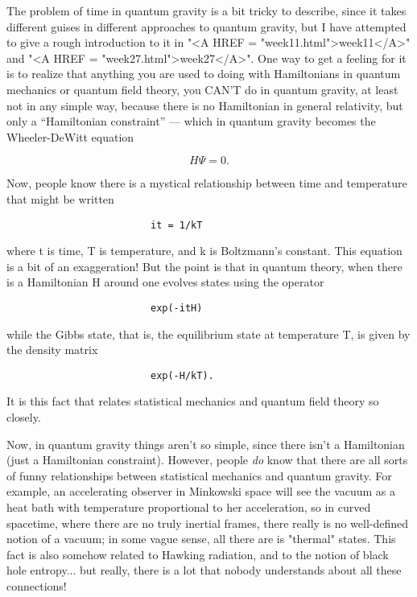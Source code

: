 The problem of time in quantum gravity is a bit tricky to describe,
since it takes different guises in different approaches to quantum
gravity, but I have attempted to give a rough introduction to it in
"<A HREF = "week11.html">week11</A>" and "<A HREF = "week27.html">week27</A>".  One way to get a feeling for it is to realize
that anything you are used to doing with Hamiltonians in quantum
mechanics or quantum field theory, you CAN'T do in quantum gravity, at
least not in any simple way, because there is no Hamiltonian in general
relativity, but only a ``Hamiltonian constraint'' --- which in quantum
gravity becomes the Wheeler-DeWitt equation

$$
                         H \Psi  = 0.
$$
    

Now, people know there is a mystical relationship between time and
temperature that might be written

\begin{verbatim}
                         it = 1/kT
\end{verbatim}
    

where t is time, T is temperature, and k is Boltzmann's constant.  This
equation is a bit of an exaggeration!  But the point is that in quantum
theory, when there is a Hamiltonian H around one evolves states using the
operator 

\begin{verbatim}
                         exp(-itH)
\end{verbatim}
    

while the Gibbs state, that is, the equilibrium state at temperature T,
is given by the density matrix

\begin{verbatim}
                         exp(-H/kT).
\end{verbatim}
    

It is this fact that relates statistical mechanics and quantum field
theory so closely.  

Now, in quantum gravity things aren't so simple, since there isn't a 
Hamiltonian (just a Hamiltonian constraint).  However, people \emph{do} know
that there are all sorts of funny relationships between statistical
mechanics and quantum gravity.  For example, an accelerating observer in
Minkowski space will see the vacuum as a heat bath with temperature
proportional to her acceleration, so in curved spacetime, where there
are no truly inertial frames, there really is no well-defined notion of
a vacuum; in some vague sense, all there are is "thermal" states.
This fact is also somehow related to Hawking radiation, and to the
notion of black hole entropy... but really, there is a lot that nobody
understands about all these connections!  

